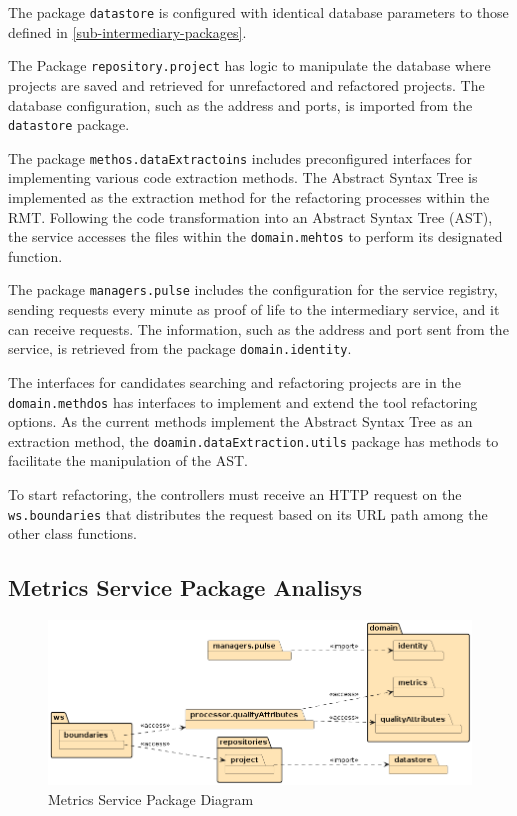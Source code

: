 The package \verb|datastore| is configured with identical database parameters to those defined in \cref{sub-intermediary-packages}.

The Package \verb|repository.project| has logic to manipulate the database where projects are saved and retrieved for unrefactored and refactored projects. The database configuration, such as the address and ports, is imported from the \verb|datastore| package.

The package \verb|methos.dataExtractoins| includes preconfigured interfaces for implementing various code extraction methods. The Abstract Syntax Tree is implemented as the extraction method for the refactoring processes within the RMT. Following the code transformation into an Abstract Syntax Tree (AST), the service accesses the files within the \verb|domain.mehtos| to perform its designated function.

The package \verb|managers.pulse| includes the configuration for the service registry, sending requests every minute as proof of life to the intermediary service, and it can receive requests. The information, such as the address and port sent from the service, is retrieved from the package \verb|domain.identity|.

The interfaces for candidates searching and refactoring projects are in the \verb|domain.methdos| has interfaces to implement and extend the tool refactoring options. As the current methods implement the Abstract Syntax Tree as an extraction method, the \verb|doamin.dataExtraction.utils| package has methods to facilitate the manipulation of the AST.

To start refactoring, the controllers must receive an HTTP request on the \verb|ws.boundaries| that distributes the request based on its URL path among the other class functions. 

\subsection{Metrics Service Package Analisys}


\begin{figure}[ht!]
\SetCaptionWidth{\textwidth}
\caption{Metrics Service Package Diagram}
\label{fig-package-metrics}
\includegraphics[width =\textwidth, scale=1.0]{Chapter-4/Figures/metrics-service.png}
\end{figure}
\FloatBarrier

